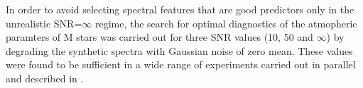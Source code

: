 



In order to avoid selecting spectral features that are good predictors
only in the unrealistic SNR=$\infty$ regime, the search for optimal
diagnostics of the atmopheric paramters of M stars was carried out for
three SNR values (10, 50 and $\infty$) by degrading the synthetic
spectra with Gaussian noise of zero mean. These values were found to
be sufficient in a wide range of experiments carried out in parallel
and described in \cite{Anaetal}.

